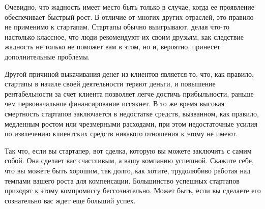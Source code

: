 \documentclass[ebook,12pt,oneside,openany]{memoir}
\begin{document}
Очевидно, что жадность имеет место быть только в случае, когда ее
проявление обеспечивает быстрый рост. В отличие от многих других
отраслей, это правило не применимо к стартапам. Стартапы обычно
выигрывают, делая что-то настолько классное, что люди рекомендуют их
своим друзьям, как следствие жадность не только не поможет вам в этом,
но и, вероятно, принесет дополнительные проблемы.

Другой причиной выкачивания денег из клиентов является то, что, как
правило, стартапы в начале своей деятельности теряют деньги, и
повышение рентабельности за счет клиента позволяет легче достичь
прибыльности, раньше чем первоначальное финансирование иссякнет. В то
же время высокая смертность стартапов заключается в недостатке
средств, вызванном, как правило, медленным ростом или чрезмерными
расходами, при этом недостаточные усилия по извлечению клиентских
средств никакого отношения к этому не имеют.

Так что, если вы стартапер, вот сделка, которую вы можете заключить с
самим собой. Она сделает вас счастливым, а вашу компанию успешной.
Скажите себе, что вы можете быть хорошим, так долго, как хотите,
трудолюбиво работая над темпами вашего роста для компенсации.
Большинство успешных стартапов приходят к этому компромиссу
бессознательно. Может быть, если вы сделаете его сознательно вас ждет
еще больший успех.
\end{document}
